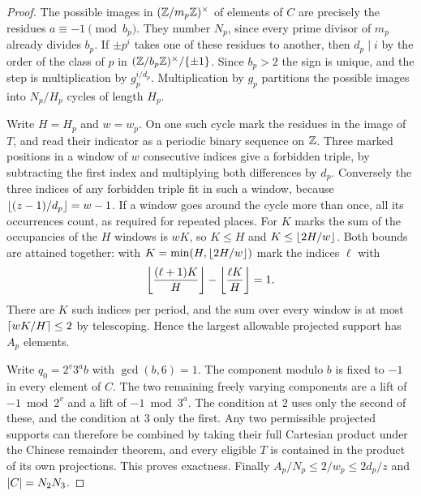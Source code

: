 \begin{proof}
The possible images in $(\Z/m_p\Z)^\times$ of elements of $C$ are precisely the residues
$a\equiv-1\pmod{b_p}$. They number $N_p$, since every prime divisor of $m_p$ already
divides $b_p$. If $\pm p^i$ takes one of these residues to another, then $d_p\mid i$ by
the order of the class of $p$ in $(\Z/b_p\Z)^\times/\set{\pm1}$. Since $b_p>2$ the sign
is unique, and the step is multiplication by $g_p^{i/d_p}$. Multiplication by $g_p$
partitions the possible images into $N_p/H_p$ cycles of length $H_p$.

Write $H=H_p$ and $w=w_p$. On one such cycle mark the residues in the image of $T$, and
read their indicator as a periodic binary sequence on $\Z$. Three marked positions in a
window of $w$ consecutive indices give a forbidden triple, by subtracting the first index
and multiplying both differences by $d_p$. Conversely the three indices of any forbidden
triple fit in such a window, because $\floor{(z-1)/d_p}=w-1$. If a window goes around the
cycle more than once, all its occurrences count, as required for repeated places. For
$K$ marks the sum of the occupancies of the $H$ windows is $wK$, so $K\le H$ and
$K\le\floor{2H/w}$. Both bounds are attained together: with $K=\min(H,\floor{2H/w})$
mark the indices $\ell$ with
\[
 \floor*{\frac{(\ell+1)K}{H}}-\floor*{\frac{\ell K}{H}}=1 .
\]
There are $K$ such indices per period, and the sum over every window is at most
$\ceil{wK/H}\le2$ by telescoping. Hence the largest allowable projected support has
$A_p$ elements.

Write $q_0=2^v3^ab$ with $\gcd(b,6)=1$. The component modulo $b$ is fixed to $-1$ in
every element of $C$. The two remaining freely varying components are a lift of
$-1\bmod2^v$ and a lift of $-1\bmod3^a$. The condition at $2$ uses only the second of
these, and the condition at $3$ only the first. Any two permissible projected supports
can therefore be combined by taking their full Cartesian product under the Chinese
remainder theorem, and every eligible $T$ is contained in the product of its own
projections. This proves exactness. Finally $A_p/N_p\le2/w_p\le2d_p/z$ and
$\abs{C}=N_2N_3$.
\end{proof}

